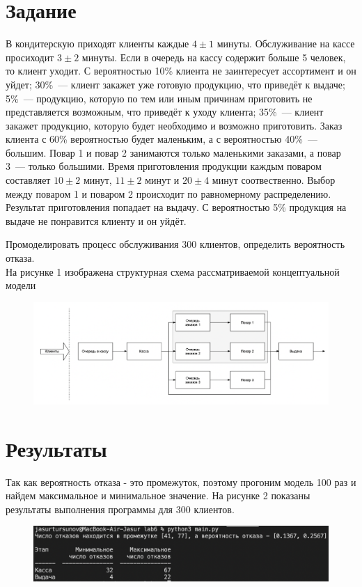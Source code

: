 \documentclass[a4paper, 12pt]{article}
\begin{document}
\section{{Задание}}

\hspace*{5mm} В кондитерскую приходят клиенты каждые $4\pm1$ минуты. Обслуживание на кассе просиходит $3\pm2$ минуты. Если в очередь на кассу содержит больше 5 человек, то клиент уходит. С вероятностью 10\% клиента не заинтересует ассортимент и он уйдет; 30\%~--- клиент закажет уже готовую продукцию, что приведёт к выдаче; 5\%~--- продукцию, которую по тем или иным причинам приготовить не представляется возможным, что приведёт к уходу клиента; 35\%~--- клиент закажет продукцию, которую будет необходимо и возможно приготовить. Заказ клиента с 60\% вероятностью будет маленьким, а с вероятностью 40\%~--- большим. Повар 1 и повар 2 занимаются только маленькими заказами, а повар 3~--- только большими. Время приготовления продукции каждым поваром составляет $10\pm2$ минут, $11\pm2$ минут и $20\pm4$ минут соотвественно. Выбор между поваром 1 и поваром 2 происходит по равномерному распределению. Результат приготовления попадает на выдачу. С вероятностью 5\% продукция на выдаче не понравится клиенту и он уйдёт.

Промоделировать процесс обслуживания 300 клиентов, определить вероятность отказа.
\\ \hspace*{5mm}На рисунке 1 изображена структурная схема рассматриваемой концептуальной модели
\begin{figure}[h!]
	\centering \includegraphics[scale=0.5]{schema}
\end{figure}

\clearpage
\newpage
\section{{Результаты}}
\hspace*{5mm}Так как вероятность отказа - это промежуток, поэтому прогоним модель 100 раз и найдем максимальное и минимальное значение. На рисунке 2 показаны результаты выполнения программы для 300 клиентов.
\begin{figure}[h!]
	\centering \includegraphics[scale=0.8]{300}
\end{figure}
\end{document}
